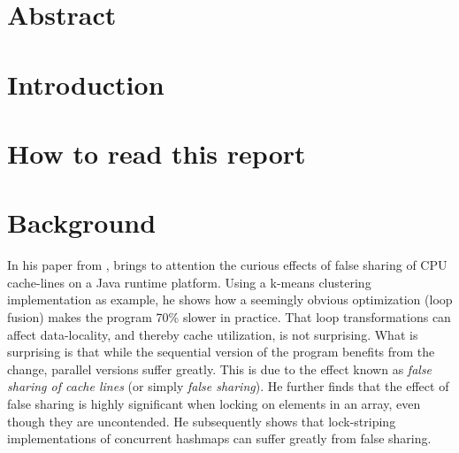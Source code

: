 \section{Abstract}
\section{Introduction}
\section{How to read this report}

\section{Background}
In his paper \cite{mystery} from \citeyear{mystery}, \citeauthor{mystery} brings to attention the curious effects of
false sharing of CPU cache-lines on a Java runtime platform. Using a k-means
clustering implementation as example, he shows how a seemingly obvious
optimization (loop fusion) makes the program 70\% slower in practice. That loop
transformations can affect data-locality,
and thereby cache utilization, is not surprising. What is surprising is that
while the sequential version of the program benefits from the change, parallel
versions suffer greatly. This is due to the effect known as \textit{false
sharing of cache lines} (or simply \textit{false sharing}). He further finds that
the effect of false sharing is highly significant when locking on elements in an
array, even though they are uncontended. He subsequently shows that
lock-striping implementations of concurrent hashmaps can suffer greatly from
false sharing.

